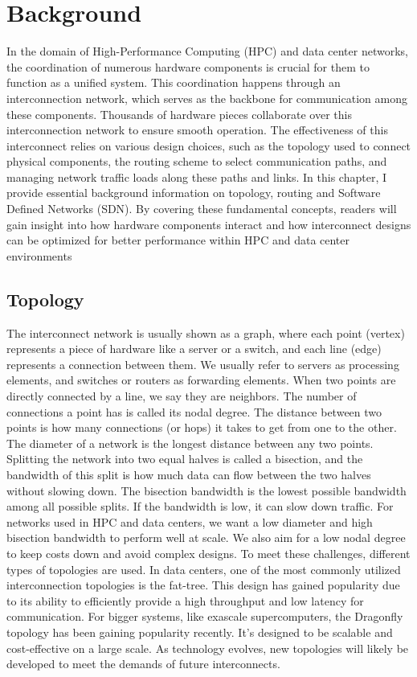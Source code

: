 \chapter{Background} In the domain of High-Performance
Computing (HPC) and data center networks, the coordination of numerous hardware
components is crucial for them to function as a unified system. This
coordination happens through an interconnection network, which serves as the
backbone for communication among these components. Thousands of hardware pieces
collaborate over this interconnection network to ensure smooth operation. The
effectiveness of this interconnect relies on various design choices, such as the
topology used to connect physical components, the routing scheme to select
communication paths, and managing network traffic loads along these paths and
links.  In this chapter, I provide essential background information on topology,
routing and Software Defined Networks (SDN). By covering these fundamental
concepts, readers will gain insight into how hardware components interact and
how interconnect designs can be optimized for better performance within HPC and
data center environments

\section{Topology} The interconnect network is usually shown as a graph, where
each point (vertex) represents a piece of hardware like a server or a switch,
and each line (edge) represents a connection between them. We usually refer to
servers as processing elements, and switches or routers as forwarding elements.
When two points are directly connected by a line, we say they are neighbors. The
number of connections a point has is called its nodal degree. The distance
between two points is how many connections (or hops) it takes to get from one to
the other. The diameter of a network is the longest distance between any two
points.  Splitting the network into two equal halves is called a bisection, and
the bandwidth of this split is how much data can flow between the two halves
without slowing down. The bisection bandwidth is the lowest possible bandwidth
among all possible splits.  If the bandwidth is low, it can slow down traffic.
For networks used in HPC and data centers, we want a low diameter and high
bisection bandwidth to perform well at scale. We also aim for a low nodal degree
to keep costs down and avoid complex designs.  To meet these challenges,
different types of topologies are used. In data centers, one of the most
commonly utilized interconnection topologies is the fat-tree. This design has
gained popularity due to its ability to efficiently provide a high throughput
and low latency for communication. For bigger systems, like exascale
supercomputers, the Dragonfly topology has been gaining popularity recently.
It's designed to be scalable and cost-effective on a large scale. As technology
evolves, new topologies will likely be developed to meet the demands of future
interconnects.

